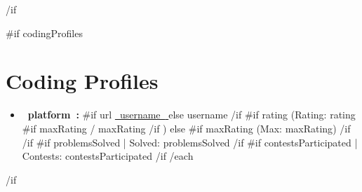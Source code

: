 \documentclass[10pt,a4paper]{article}
\begin{document}
{{/if}}

{{#if codingProfiles}}
\section{Coding Profiles}

\begin{itemize}
    {{#each codingProfiles}}
    \item
    \textbf{ {{~platform~}}: }
    {{#if url}}
    \href{ {{~url~}} }{ {{~username~}} }
    {{else}}
    {{username}}
    {{/if}}
    {{#if rating}}
    \enspace (Rating: {{rating}}
    {{#if maxRating}}
    / {{maxRating}}
    {{/if}}
    )
    {{else}}
    {{#if maxRating}}
    \enspace (Max: {{maxRating}})
    {{/if}}
    {{/if}}
    {{#if problemsSolved}}
    \enspace | \enspace Solved: {{problemsSolved}}
    {{/if}}
    {{#if contestsParticipated}}
    \enspace | \enspace Contests: {{contestsParticipated}}
    {{/if}}
    {{/each}}
\end{itemize}

{{/if}}
\end{document}

